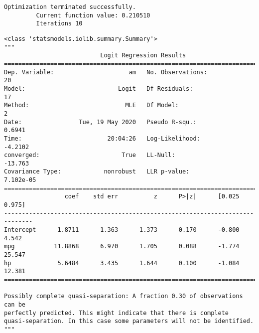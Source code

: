 \documentclass[11pt]{article}
\makeatletter
\newcommand{\boxspacing}{\kern\kvtcb@left@rule\kern\kvtcb@boxsep}
\newcommand{\prompt}[4]{
        \ttfamily\llap{{\color{#2}[#3]:\hspace{3pt}#4}}\vspace{-\baselineskip}
    }
\makeatother
\begin{document}
    \begin{Verbatim}[commandchars=\\\{\}]
Optimization terminated successfully.
         Current function value: 0.210510
         Iterations 10
    \end{Verbatim}

            \begin{tcolorbox}[breakable, size=fbox, boxrule=.5pt, pad at break*=1mm, opacityfill=0]
\prompt{Out}{outcolor}{31}{\boxspacing}
\begin{Verbatim}[commandchars=\\\{\}]
<class 'statsmodels.iolib.summary.Summary'>
"""
                           Logit Regression Results
==============================================================================
Dep. Variable:                     am   No. Observations:                   20
Model:                          Logit   Df Residuals:                       17
Method:                           MLE   Df Model:                            2
Date:                Tue, 19 May 2020   Pseudo R-squ.:                  0.6941
Time:                        20:04:26   Log-Likelihood:                -4.2102
converged:                       True   LL-Null:                       -13.763
Covariance Type:            nonrobust   LLR p-value:                 7.102e-05
==============================================================================
                 coef    std err          z      P>|z|      [0.025      0.975]
------------------------------------------------------------------------------
Intercept      1.8711      1.363      1.373      0.170      -0.800       4.542
mpg           11.8868      6.970      1.705      0.088      -1.774      25.547
hp             5.6484      3.435      1.644      0.100      -1.084      12.381
==============================================================================

Possibly complete quasi-separation: A fraction 0.30 of observations can be
perfectly predicted. This might indicate that there is complete
quasi-separation. In this case some parameters will not be identified.
"""
\end{Verbatim}
\end{tcolorbox}
        
\end{document}
